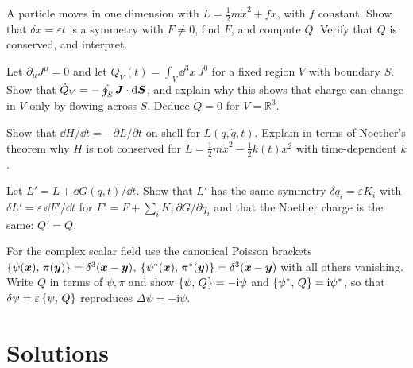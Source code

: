 \documentclass[11pt]{article}
\newcommand{\eps}{\varepsilon}
\begin{document}
\begin{exercise}\label{ex:boostforce}
A particle moves in one dimension with $L=\tfrac12m\dot x^2+fx$, with $f$ constant. Show that $\delta x=\eps t$ is a symmetry with $F\neq0$, find $F$, and compute $Q$. Verify that $Q$ is conserved, and interpret.
\end{exercise}

\begin{exercise}\label{ex:continuity}
Let $\partial_\mu J^\mu=0$ and let $Q_V(t)=\int_V\dd^3x\,J^0$ for a fixed region $V$ with boundary $S$. Show that $\dot Q_V=-\oint_S\bm{J}\cdot\mathrm{d}\bm{S}$, and explain why this shows that charge can change in $V$ only by flowing across $S$. Deduce $\dot Q=0$ for $V=\mathbb R^3$.
\end{exercise}

\begin{exercise}\label{ex:time-dep}
Show that $\dd H/\dd t=-\partial L/\partial t$ on-shell for $L(q,\dot q,t)$. Explain in terms of Noether's theorem why $H$ is not conserved for $L=\tfrac12m\dot x^2-\tfrac12k(t)x^2$ with time-dependent $k$.
\end{exercise}

\begin{exercise}\label{ex:ambiguity}
Let $L'=L+\dd G(q,t)/\dd t$. Show that $L'$ has the same symmetry $\delta q_i=\eps K_i$ with $\delta L'=\eps\,\dd F'/\dd t$ for $F'=F+\sum_iK_i\,\partial G/\partial q_i$ and that the Noether charge is the same: $Q'=Q$.
\end{exercise}

\begin{exercise}\label{ex:Qgenerates}
For the complex scalar field use the canonical Poisson brackets $\left\{\psi(\bm{x}),\,\pi(\bm{y})\right\}=\delta^3(\bm{x}-\bm{y})$, $\left\{\psi^*(\bm{x}),\,\pi^*(\bm{y})\right\}=\delta^3(\bm{x}-\bm{y})$ with all others vanishing. Write $Q$ in terms of $\psi,\pi$ and show $\left\{\psi,\,Q\right\}=-\mathrm i\psi$ and $\left\{\psi^*,\,Q\right\}=\mathrm i\psi^*$, so that $\delta\psi=\eps\pb{\psi}{Q}$ reproduces $\Delta\psi=-\mathrm i\psi$.
\end{exercise}

\section{Solutions}\label{sec:solutions}
\end{document}
